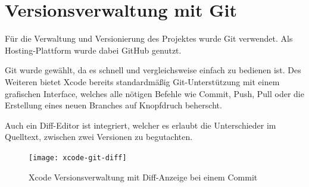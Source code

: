 \section{Versionsverwaltung mit Git}
\label{sec:tools:git}
Für die Verwaltung und Versionierung des Projektes wurde Git verwendet. Als Hosting-Plattform wurde dabei GitHub genutzt.

Git wurde gewählt, da es schnell und vergleichsweise einfach zu bedienen ist. Des Weiteren bietet Xcode bereits standardmäßig Git-Unterstützung mit einem grafischen Interface, welches alle nötigen Befehle wie Commit, Push, Pull oder die Erstellung eines neuen Branches auf Knopfdruch beherscht.

Auch ein Diff-Editor ist integriert, welcher es erlaubt die Unterschieder im Quelltext, zwischen zwei Versionen zu begutachten.

\begin{figure}[htb!]
		  \centering
	\texttt{[image: xcode-git-diff]}
	\caption{Xcode Versionsverwaltung mit Diff-Anzeige bei einem Commit}
	\label{xcode-git-diff}
\end{figure}


